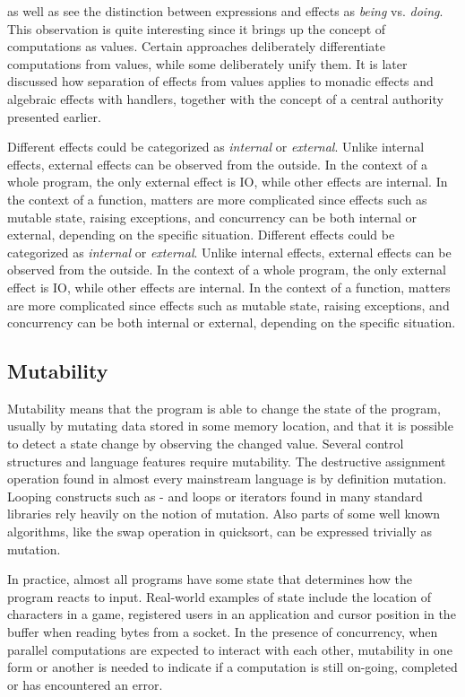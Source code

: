 \textcite{imperative-fp} as well as \textcite{do-be-do-be-do} see the distinction between expressions and effects as \textit{being} vs. \textit{doing}. This observation is quite interesting since it brings up the concept of computations as values. Certain approaches deliberately differentiate computations from values, while some deliberately unify them. It is later discussed how separation of effects from values applies to monadic effects and algebraic effects with handlers, together with the concept of a central authority presented earlier.

Different effects could be categorized as \textit{internal} or \textit{external}. Unlike internal effects, external effects can be observed from the outside. In the context of a whole program, the only external effect is IO, while other effects are internal. In the context of a function, matters are more complicated since effects such as mutable state, raising exceptions, and concurrency can be both internal or external, depending on the specific situation.
Different effects could be categorized as \textit{internal} or \textit{external}. Unlike internal effects, external effects can be observed from the outside. In the context of a whole program, the only external effect is IO, while other effects are internal. In the context of a function, matters are more complicated since effects such as mutable state, raising exceptions, and concurrency can be both internal or external, depending on the specific situation.


\subsection{Mutability} 
Mutability means that the program is able to change the state of the program, usually by mutating data stored in some memory location, and that it is possible to detect a state change by observing the changed value. Several control structures and language features require mutability. The destructive assignment operation found in almost every mainstream language is by definition mutation.~\cite[Chapter~3]{sicp} Looping constructs such as - and  loops or iterators found in many standard libraries rely heavily on the notion of mutation. Also parts of some well known algorithms, like the swap operation in quicksort, can be expressed trivially as mutation.

In practice, almost all programs have some state that determines how the program reacts to input. Real-world examples of state include the location of characters in a game, registered users in an application and cursor position in the buffer when reading bytes from a socket. In the presence of concurrency, when parallel computations are expected to interact with each other, mutability in one form or another is needed to indicate if a computation is still on-going, completed or has encountered an error.


